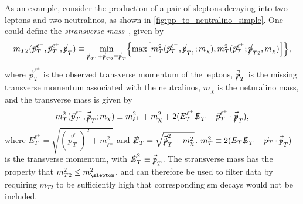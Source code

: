 As an example, consider the production of a pair of sleptons decaying into two leptons and two neutralinos, as shown in \cref{fig:pp_to_neutralino_simple}.
One could define the \emph{stransverse mass}~\cite{Lester:1999tx,Barr:2003rg}, given by
\begin{equation}
    m_{T2}(\vec{p}_T^{\ell^-}, \vec{p}_T^{\ell^+}, \vec{\slashed{p}}_T)
    \equiv \min_{\vec{\slashed{p}}_{T1} + \vec{\slashed{p}}_{T2} = \vec{\slashed{p}}_T} \Bigl\{
        \max\Bigl[
            m_T^2(\vec{p}_T^{\ell^-}, \vec{\slashed{p}}_{T1}; m_\chi), m_T^2(\vec{p}_T^{\ell^+}; \vec{\slashed{p}}_{T2}, m_\chi)
        \Bigr]
    \Bigr\},
\end{equation}
where $\vec{p}_T^{\ell^\pm}$ is the observed transverse momentum of the leptons, $\vec{\slashed{p}}_T$ is the missing transverse momentum associated with the neutralinos, $m_\chi$ is the neturalino mass, and the transverse mass is given by
\begin{equation}
    m_T^2(\vec{p}_T^{\ell^\pm}, \vec{\slashed{p}}_T; m_\chi) \equiv m_{\ell^\pm}^2 + m_\chi^2 + 2(E_T^{\ell^\pm} \slashed{E}_T - \vec{p}_T^{\ell^\pm}\cdot\vec{\slashed{p}}_T),
\end{equation}
where $E_T^{\ell^\pm} = \sqrt{(\vec{p}_T^{\ell^\pm})^2+m_{\ell^\pm}^2}$ and $\slashed{E}_T = \sqrt{\vec{\slashed{p}}_T^2 + m_\chi^2}$.
$m_T^2\equiv 2(E_T\slashed{E}_T - \vec{p}_T\cdot\vec{\slashed{p}}_T)$ is the transverse momentum, with $\slashed{E}_T^2\equiv\vec{\slashed{p}}_T$.
The stransverse mass has the property that $m_{T2}^2 \leq m_{\slepton}^2$, and can therefore be used to filter data by requiring $m_{T2}$ to be sufficiently high that corresponding \gls{sm} decays would not be included.

